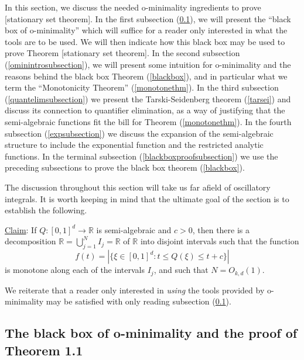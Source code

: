 \documentclass[12pt]{article}
\let\oldref\ref
\renewcommand{\ref}[1]{(\oldref{#1})}
\newcommand{\R}{\mathbb{R}}
\theoremstyle{definition}
\theoremstyle{remark}
\numberwithin{equation}{section}
\begin{document}
In this section, we discuss the needed o-minimality ingredients to prove [stationary set theorem]. In the first subsection \ref{blackboxsubsection}, we will present the ``black box of o-minimality'' which will suffice for a reader only interested in what the tools are to be used. We will then indicate how this black box may be used to prove Theorem [stationary set theorem]. In the second subsection \ref{ominintrosubsection}, we will present some intuition for o-minimality and the reasons behind the black box Theorem \ref{blackbox}, and in particular what we term the ``Monotonicity Theorem'' \ref{monotonethm}. In the third subsection \ref{quantelimsubsection} we present the Tarski-Seidenberg theorem \ref{tarsei} and discuss its connection to quantifier elimination, as a way of justifying that the semi-algebraic functions fit the bill for Theorem \ref{monotonethm}. In the fourth subsection \ref{expsubsection} we discuss the expansion of the semi-algebraic structure to include the exponential function and the restricted analytic functions. In the terminal subsection \ref{blackboxproofsubsection} we use the preceding subsections to prove the black box theorem \ref{blackbox}.

The discussion throughout this section will take us far afield of oscillatory integrals. It is worth keeping in mind that the ultimate goal of the section is to establish the following.

    \begin{framed}

    \underline{Claim}: If $Q:[0,1]^d\to\R$ is semi-algebraic and $c>0$, then there is a decomposition $\R=\bigcup_{j=1}^{N}I_j=\R$ of $\R$ into disjoint intervals such that the function
    \begin{equation*}
        f(t)=|\{\xi\in[0,1]^d:t\leq Q(\xi)\leq t+c\}|
    \end{equation*}
    is monotone along each of the intervals $I_j$, and such that $N=O_{k,d}(1)$.

    \end{framed}

We reiterate that a reader only interested in \textit{using} the tools provided by o-minimality may be satisfied with only reading subsection \ref{blackboxsubsection}.

\subsection{The black box of o-minimality and the proof of Theorem 1.1}\label{blackboxsubsection}
\end{document}
